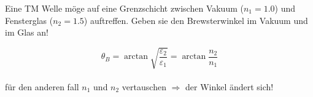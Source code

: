\begin{question}[section=4,name={Brewsterwinkel},difficulty=,quantity=,type=thr,tags={}]
	Eine TM Welle möge auf eine Grenzschicht zwischen Vakuum ($n_1=1.0$) und Fensterglas ($n_2=1.5$) auftreffen. Geben sie den Brewsterwinkel im Vakuum und im Glas an!
	
\end{question}
\begin{solution}
	\[\theta_B=\arctan{\sqrt{\frac{\varepsilon_2}{\varepsilon_1}}}=\arctan{\frac{n_2}{n_1}}\]\\
	für den anderen fall $n_1$ und $n_2$ vertauschen $\Rightarrow$ der Winkel ändert sich!
\end{solution}